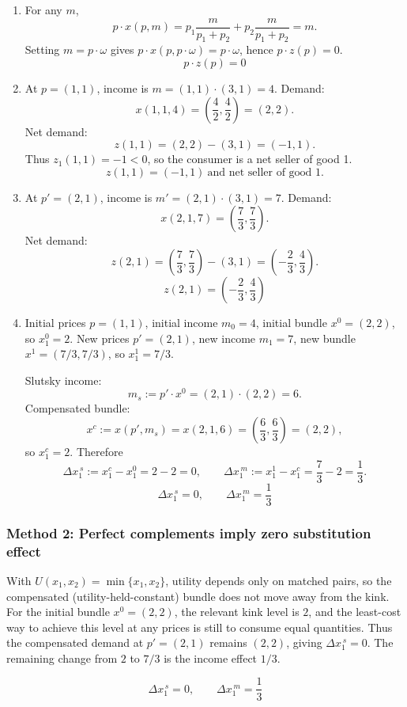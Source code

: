\documentclass[12pt]{article}
\newcommand{\dotp}{\cdot}
\begin{document}
\begin{enumerate}[label=\arabic*., leftmargin=*]
\item For any \(m\),
\[
p\dotp x(p,m)=p_1\frac{m}{p_1+p_2}+p_2\frac{m}{p_1+p_2}=m.
\]
Setting \(m=p\dotp\omega\) gives \(p\dotp x(p,p\dotp\omega)=p\dotp\omega\), hence \(p\dotp z(p)=0\).
\[
\boxed{\,p\dotp z(p)=0\,}
\]

\item At \(p=(1,1)\), income is \(m=(1,1)\dotp(3,1)=4\). Demand:
\[
x(1,1,4)=\left(\frac{4}{2},\frac{4}{2}\right)=(2,2).
\]
Net demand:
\[
z(1,1)=(2,2)-(3,1)=(-1,1).
\]
Thus \(z_1(1,1)=-1<0\), so the consumer is a net seller of good 1.
\[
\boxed{\,z(1,1)=(-1,1)\ \text{and net seller of good 1.}\,}
\]

\item At \(p'=(2,1)\), income is \(m'=(2,1)\dotp(3,1)=7\). Demand:
\[
x(2,1,7)=\left(\frac{7}{3},\frac{7}{3}\right).
\]
Net demand:
\[
z(2,1)=\left(\frac{7}{3},\frac{7}{3}\right)-(3,1)=\left(-\frac{2}{3},\frac{4}{3}\right).
\]
\[
\boxed{\,z(2,1)=\left(-\dfrac{2}{3},\dfrac{4}{3}\right)\,}
\]

\item Initial prices \(p=(1,1)\), initial income \(m_0=4\), initial bundle \(x^0=(2,2)\), so \(x_1^0=2\).
New prices \(p'=(2,1)\), new income \(m_1=7\), new bundle \(x^1=(7/3,7/3)\), so \(x_1^1=7/3\).

Slutsky income:
\[
m_s:=p'\dotp x^0=(2,1)\dotp(2,2)=6.
\]
Compensated bundle:
\[
x^c:=x(p',m_s)=x(2,1,6)=\left(\frac{6}{3},\frac{6}{3}\right)=(2,2),
\]
so \(x_1^c=2\). Therefore
\[
\Delta x_1^{\,s}:=x_1^c-x_1^0=2-2=0,
\qquad
\Delta x_1^{\,m}:=x_1^1-x_1^c=\frac{7}{3}-2=\frac{1}{3}.
\]
\[
\boxed{\,\Delta x_1^{\,s}=0,\qquad \Delta x_1^{\,m}=\dfrac{1}{3}\,}
\]
\end{enumerate}

\subsubsection*{Method 2: Perfect complements imply zero substitution effect}
With \(U(x_1,x_2)=\min\{x_1,x_2\}\), utility depends only on matched pairs, so the compensated (utility-held-constant) bundle does not move away from the kink.
For the initial bundle \(x^0=(2,2)\), the relevant kink level is \(2\), and the least-cost way to achieve this level at any prices is still to consume equal quantities.
Thus the compensated demand at \(p'=(2,1)\) remains \((2,2)\), giving \(\Delta x_1^{\,s}=0\). The remaining change from \(2\) to \(7/3\) is the income effect \(1/3\).

\[
\boxed{\,\Delta x_1^{\,s}=0,\qquad \Delta x_1^{\,m}=\dfrac{1}{3}\,}
\]
\end{document}
